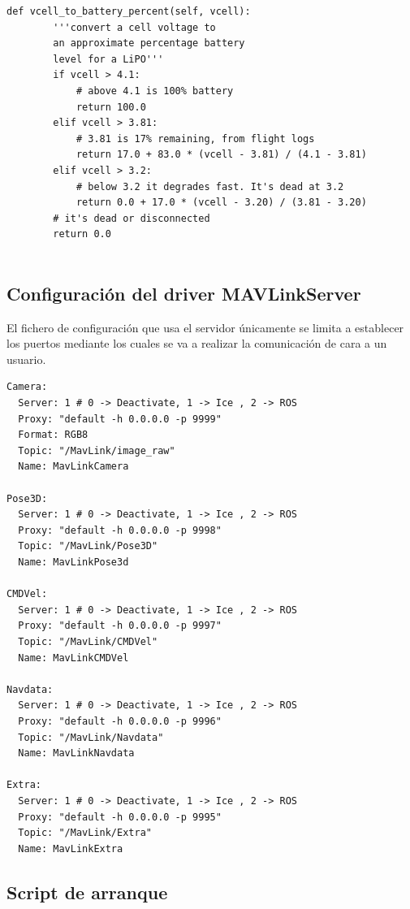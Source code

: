 \begin{lstlisting}[frame=single]
    def vcell_to_battery_percent(self, vcell):
        '''convert a cell voltage to 
        an approximate percentage battery 
        level for a LiPO'''
        if vcell > 4.1:
            # above 4.1 is 100% battery
            return 100.0
        elif vcell > 3.81:
            # 3.81 is 17% remaining, from flight logs
            return 17.0 + 83.0 * (vcell - 3.81) / (4.1 - 3.81)
        elif vcell > 3.2:
            # below 3.2 it degrades fast. It's dead at 3.2
            return 0.0 + 17.0 * (vcell - 3.20) / (3.81 - 3.20)
        # it's dead or disconnected
        return 0.0
        
\end{lstlisting}

\subsection{Configuración del driver MAVLinkServer}

El fichero de configuración que usa el servidor únicamente se limita a establecer los puertos mediante los cuales se va a realizar la comunicación de cara a un usuario.


\begin{lstlisting}[frame=single]
Camera:
  Server: 1 # 0 -> Deactivate, 1 -> Ice , 2 -> ROS
  Proxy: "default -h 0.0.0.0 -p 9999"
  Format: RGB8
  Topic: "/MavLink/image_raw"
  Name: MavLinkCamera

Pose3D:
  Server: 1 # 0 -> Deactivate, 1 -> Ice , 2 -> ROS
  Proxy: "default -h 0.0.0.0 -p 9998"
  Topic: "/MavLink/Pose3D"
  Name: MavLinkPose3d

CMDVel:
  Server: 1 # 0 -> Deactivate, 1 -> Ice , 2 -> ROS
  Proxy: "default -h 0.0.0.0 -p 9997"
  Topic: "/MavLink/CMDVel"
  Name: MavLinkCMDVel

Navdata:
  Server: 1 # 0 -> Deactivate, 1 -> Ice , 2 -> ROS
  Proxy: "default -h 0.0.0.0 -p 9996"
  Topic: "/MavLink/Navdata"
  Name: MavLinkNavdata

Extra:
  Server: 1 # 0 -> Deactivate, 1 -> Ice , 2 -> ROS
  Proxy: "default -h 0.0.0.0 -p 9995"
  Topic: "/MavLink/Extra"
  Name: MavLinkExtra
\end{lstlisting}



\subsection{Script de arranque}
\label{Script de arranque}

